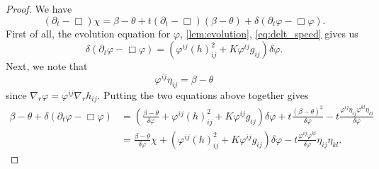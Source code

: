 \documentclass{amsart}
\begin{document}
\begin{proof}
We have
\[
(\partial_t - \Box)\chi = \beta - \theta + t(\partial_{t} - \Box)(\beta - \theta) + \delta(\partial_t \varphi - \Box\varphi).
\]
First of all, the evolution equation for \(\varphi\), \cref{lem:evolution}, \cref{eq:delt_speed} gives us
\[
\delta(\partial_t \varphi - \Box\varphi) = \left(\varphi^{ij}(h)^2_{ij} + K\varphi^{ij}g_{ij}\right)\delta\varphi.
\]
Next, we note that
\[
\varphi^{ij} \eta_{ij} = \beta - \theta
\]
since \(\nabla_r \varphi = \varphi^{ij} \nabla_r h_{ij}\). Putting the two equations above together gives
\begin{equation}
\label{eq:deltchi1}
\begin{split}
\beta - \theta + \delta(\partial_t \varphi - \Box\varphi) &= \left(\frac{\beta-\theta}{\delta\varphi} + \varphi^{ij}(h)^2_{ij} + K\varphi^{ij}g_{ij}\right)\delta\varphi + t \frac{(\beta - \theta)^2}{\delta\varphi} - t \frac{\varphi^{ij}\eta_{ij} \varphi^{kl}\eta_{kl}}{\delta\varphi} \\
&= \frac{\beta-\theta}{\delta\varphi} \chi + \left(\varphi^{ij}(h)^2_{ij} + K\varphi^{ij}g_{ij}\right)\delta\varphi - t \frac{\varphi^{ij}\varphi^{kl}}{\delta\varphi} \eta_{ij}\eta_{kl}.
\end{split}
\end{equation}


\end{proof}
\end{document}
